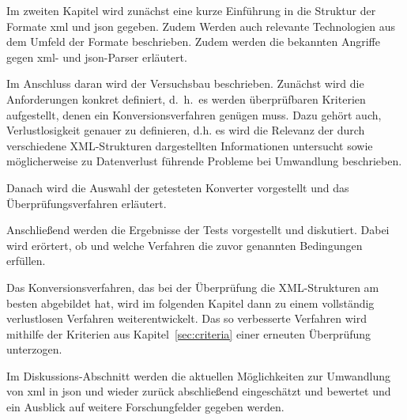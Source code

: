 Im zweiten Kapitel wird zunächst eine kurze Einführung in die Struktur der Formate \acrshort{xml} und \acrshort{json} gegeben. Zudem Werden auch relevante Technologien aus dem Umfeld der Formate beschrieben.  Zudem werden die bekannten Angriffe gegen \acrshort{xml}- und \acrshort{json}-Parser erläutert.

Im Anschluss daran wird der Versuchsbau beschrieben. Zunächst wird die Anforderungen konkret definiert, d.~h.\ es werden
überprüfbaren Kriterien aufgestellt, denen ein Konversionsverfahren genügen
muss. Dazu gehört auch, Verlustlosigkeit genauer zu definieren, d.h.
es wird die Relevanz der durch verschiedene XML-Strukturen dargestellten
Informationen untersucht sowie möglicherweise zu Datenverlust führende
Probleme bei Umwandlung beschrieben.

Danach wird die Auswahl der getesteten Konverter vorgestellt und das Überprüfungsverfahren erläutert.

Anschließend werden die Ergebnisse der Tests vorgestellt und diskutiert.
Dabei wird erörtert, ob und welche Verfahren die zuvor genannten Bedingungen
erfüllen.

Das Konversionsverfahren, das bei der Überprüfung die XML-Strukturen am besten abgebildet hat, wird im folgenden Kapitel dann zu einem vollständig verlustlosen Verfahren weiterentwickelt. Das so verbesserte Verfahren wird mithilfe der Kriterien aus Kapitel~\ref{sec:criteria} einer erneuten Überprüfung unterzogen.

Im Diskussions-Abschnitt werden die aktuellen Möglichkeiten zur Umwandlung
von \acrshort{xml} in \acrshort{json} und wieder zurück abschließend eingeschätzt und bewertet und ein Ausblick auf weitere Forschungfelder gegeben werden.
